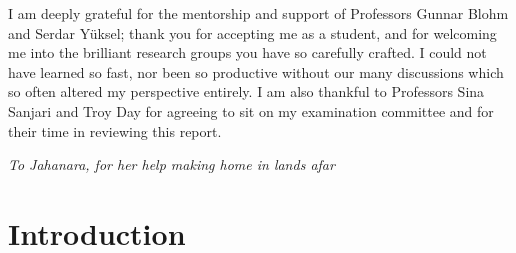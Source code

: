 \documentclass[12pt, oneside]{report}
\newcommand{\1}[1]{\mathbbm{1}_{\{#1\}}}
\theoremstyle{definition}
\begin{document}
\indent I am deeply grateful for the mentorship and support of Professors Gunnar
Blohm and Serdar Y\"uksel; thank you for accepting me as a student, and for welcoming me into
the brilliant research groups you have so carefully crafted. I could not have learned so fast, nor been so productive
without our many discussions which so often altered my perspective entirely.
I am also thankful to Professors Sina Sanjari and Troy Day for agreeing to sit on my examination committee
and for their time in reviewing this report. 

\newpage
\thispagestyle{empty}
\vspace*{\fill}
\begin{center}
    \textit{To Jahanara, for her help making home in lands afar}
\end{center}
\vspace*{\fill}

\newpage
\tableofcontents
\chapter{Introduction}
\end{document}
